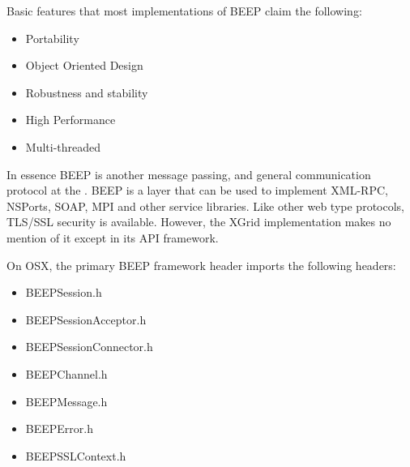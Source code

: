 \documentclass[11pt]{article}
\begin{document}
\newpage
\begin{Large}
 Basic features that most implementations of BEEP claim the following:
 \begin{itemize}
\item Portability 
 \item Object Oriented Design
 \item Robustness and stability 
 \item High Performance
 \item Multi-threaded
\end{itemize}
In essence BEEP is another %
message passing, and general communication protocol at the .  %
BEEP is a layer that can be used to implement XML-RPC, NSPorts, SOAP, MPI and other service libraries.  
Like other web type protocols, TLS/SSL security is available.  However, the XGrid implementation makes no mention of it except in its API framework.   
\end{Large}

On OSX, the primary BEEP framework header imports the following headers:
\begin{itemize}
\item BEEPSession.h
\item BEEPSessionAcceptor.h
\item BEEPSessionConnector.h
\item BEEPChannel.h
\item BEEPMessage.h
\item BEEPError.h
\item BEEPSSLContext.h
\end{itemize}
\end{document}
